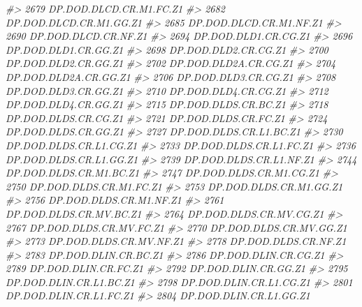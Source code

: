 \documentclass[
]{bxjsbook}
\newenvironment{Shaded}{\begin{snugshade}}{\end{snugshade}}
\newcommand{\CommentTok}[1]{\textcolor[rgb]{0.56,0.35,0.01}{\textit{#1}}}
\theoremstyle{definition}
\theoremstyle{definition}
\theoremstyle{definition}
\theoremstyle{definition}
\theoremstyle{remark}
\begin{document}
\begin{Shaded}
\begin{Highlighting}[]
\CommentTok{\#\textgreater{} 2679     DP.DOD.DLCD.CR.M1.FC.Z1}
\CommentTok{\#\textgreater{} 2682     DP.DOD.DLCD.CR.M1.GG.Z1}
\CommentTok{\#\textgreater{} 2685     DP.DOD.DLCD.CR.M1.NF.Z1}
\CommentTok{\#\textgreater{} 2690        DP.DOD.DLCD.CR.NF.Z1}
\CommentTok{\#\textgreater{} 2694        DP.DOD.DLD1.CR.CG.Z1}
\CommentTok{\#\textgreater{} 2696        DP.DOD.DLD1.CR.GG.Z1}
\CommentTok{\#\textgreater{} 2698        DP.DOD.DLD2.CR.CG.Z1}
\CommentTok{\#\textgreater{} 2700        DP.DOD.DLD2.CR.GG.Z1}
\CommentTok{\#\textgreater{} 2702       DP.DOD.DLD2A.CR.CG.Z1}
\CommentTok{\#\textgreater{} 2704       DP.DOD.DLD2A.CR.GG.Z1}
\CommentTok{\#\textgreater{} 2706        DP.DOD.DLD3.CR.CG.Z1}
\CommentTok{\#\textgreater{} 2708        DP.DOD.DLD3.CR.GG.Z1}
\CommentTok{\#\textgreater{} 2710        DP.DOD.DLD4.CR.CG.Z1}
\CommentTok{\#\textgreater{} 2712        DP.DOD.DLD4.CR.GG.Z1}
\CommentTok{\#\textgreater{} 2715        DP.DOD.DLDS.CR.BC.Z1}
\CommentTok{\#\textgreater{} 2718        DP.DOD.DLDS.CR.CG.Z1}
\CommentTok{\#\textgreater{} 2721        DP.DOD.DLDS.CR.FC.Z1}
\CommentTok{\#\textgreater{} 2724        DP.DOD.DLDS.CR.GG.Z1}
\CommentTok{\#\textgreater{} 2727     DP.DOD.DLDS.CR.L1.BC.Z1}
\CommentTok{\#\textgreater{} 2730     DP.DOD.DLDS.CR.L1.CG.Z1}
\CommentTok{\#\textgreater{} 2733     DP.DOD.DLDS.CR.L1.FC.Z1}
\CommentTok{\#\textgreater{} 2736     DP.DOD.DLDS.CR.L1.GG.Z1}
\CommentTok{\#\textgreater{} 2739     DP.DOD.DLDS.CR.L1.NF.Z1}
\CommentTok{\#\textgreater{} 2744     DP.DOD.DLDS.CR.M1.BC.Z1}
\CommentTok{\#\textgreater{} 2747     DP.DOD.DLDS.CR.M1.CG.Z1}
\CommentTok{\#\textgreater{} 2750     DP.DOD.DLDS.CR.M1.FC.Z1}
\CommentTok{\#\textgreater{} 2753     DP.DOD.DLDS.CR.M1.GG.Z1}
\CommentTok{\#\textgreater{} 2756     DP.DOD.DLDS.CR.M1.NF.Z1}
\CommentTok{\#\textgreater{} 2761     DP.DOD.DLDS.CR.MV.BC.Z1}
\CommentTok{\#\textgreater{} 2764     DP.DOD.DLDS.CR.MV.CG.Z1}
\CommentTok{\#\textgreater{} 2767     DP.DOD.DLDS.CR.MV.FC.Z1}
\CommentTok{\#\textgreater{} 2770     DP.DOD.DLDS.CR.MV.GG.Z1}
\CommentTok{\#\textgreater{} 2773     DP.DOD.DLDS.CR.MV.NF.Z1}
\CommentTok{\#\textgreater{} 2778        DP.DOD.DLDS.CR.NF.Z1}
\CommentTok{\#\textgreater{} 2783        DP.DOD.DLIN.CR.BC.Z1}
\CommentTok{\#\textgreater{} 2786        DP.DOD.DLIN.CR.CG.Z1}
\CommentTok{\#\textgreater{} 2789        DP.DOD.DLIN.CR.FC.Z1}
\CommentTok{\#\textgreater{} 2792        DP.DOD.DLIN.CR.GG.Z1}
\CommentTok{\#\textgreater{} 2795     DP.DOD.DLIN.CR.L1.BC.Z1}
\CommentTok{\#\textgreater{} 2798     DP.DOD.DLIN.CR.L1.CG.Z1}
\CommentTok{\#\textgreater{} 2801     DP.DOD.DLIN.CR.L1.FC.Z1}
\CommentTok{\#\textgreater{} 2804     DP.DOD.DLIN.CR.L1.GG.Z1}

\end{Highlighting}
\end{Shaded}
\end{document}

